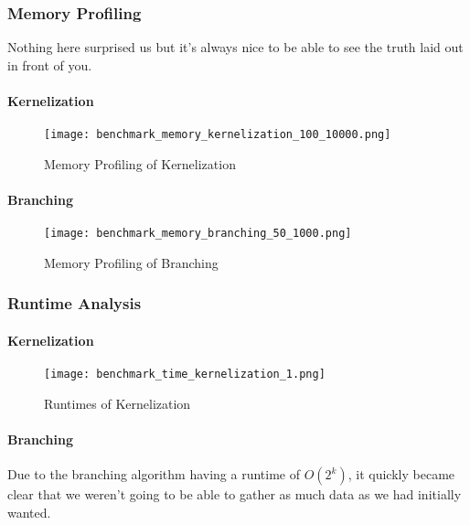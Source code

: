 \subsubsection{Memory Profiling}

Nothing here surprised us but it's always nice to be able to see the truth laid
out in front of you.

\paragraph{Kernelization}

\begin{figure}[H]
    \centering
    \texttt{[image: benchmark\_memory\_kernelization\_100\_10000.png]}
    \caption{Memory Profiling of Kernelization}
    \label{fig:benchmark_mem_kernelization}
\end{figure}

\paragraph{Branching}

\begin{figure}[H]
    \centering
    \texttt{[image: benchmark\_memory\_branching\_50\_1000.png]}
    \caption{Memory Profiling of Branching}
    \label{fig:benchmark_mem_branching}
\end{figure}

\subsubsection{Runtime Analysis}

\paragraph{Kernelization}

\begin{figure}[H]
    \centering
    \texttt{[image: benchmark\_time\_kernelization\_1.png]}
    \caption{Runtimes of Kernelization}
    \label{fig:benchmark_time_kernelization}
\end{figure}

\paragraph{Branching}

Due to the branching algorithm having a runtime of \(O(2^k)\), it quickly
became clear that we weren't going to be able to gather as much data as we had
initially wanted.

